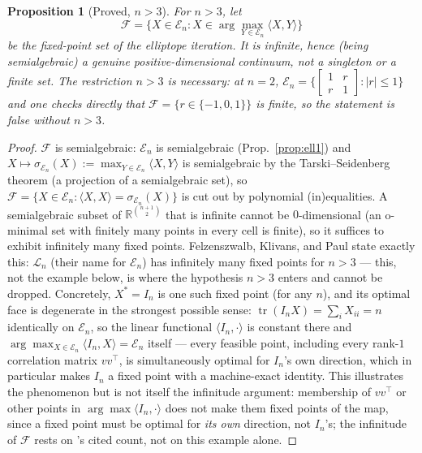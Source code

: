 \documentclass[11pt]{article}
\theoremstyle{plain}
\newtheorem{proposition}[theorem]{Proposition}
\theoremstyle{definition}
\theoremstyle{remark}
\newcommand{\R}{\mathbb R}
\newcommand{\El}{\mathcal E_n}
\begin{document}
\begin{proposition}[Proved, $n>3$]\label{prop:ell3}
For $n>3$, let
\[
\mathcal F=\{X\in\El:X\in\arg\max_{Y\in\El}\langle X,Y\rangle\}
\]
be the fixed-point set of the elliptope iteration. It is infinite, hence (being
semialgebraic) a genuine positive-dimensional continuum, not a singleton
or a finite set. The restriction $n>3$ is necessary: at
$n=2$, $\El=\{[\begin{smallmatrix}1&r\\r&1\end{smallmatrix}]:|r|\le1\}$ and
one checks directly that $\mathcal F=\{r\in\{-1,0,1\}\}$ is finite, so the
statement is false without $n>3$.
\end{proposition}
\begin{proof}
$\mathcal F$ is semialgebraic: $\El$ is semialgebraic
(Prop.~\ref{prop:ell1}) and $X\mapsto\sigma_{\El}(X):=\max_{Y\in\El}\langle
X,Y\rangle$ is semialgebraic by the Tarski--Seidenberg theorem (a
projection of a semialgebraic set), so $\mathcal F=\{X\in\El:\langle
X,X\rangle=\sigma_{\El}(X)\}$ is cut out by polynomial (in)equalities. A
semialgebraic subset of $\R^{\binom{n+1}2}$ that is infinite cannot be
$0$-dimensional (an o-minimal set with finitely many points in every cell
is finite), so it suffices to exhibit infinitely many fixed points.
Felzenszwalb, Klivans, and Paul \cite{FKP21} state exactly this: $\mathcal
L_n$ (their name for $\El$) has infinitely many fixed points for $n>3$ ---
this, not the example below, is where the hypothesis $n>3$ enters and
cannot be dropped. Concretely, $X^*=I_n$ is one such fixed point (for any
$n$), and its optimal face is
degenerate in the strongest possible sense: $\operatorname{tr}(I_nX)=\sum_iX_{ii}=n$
identically on $\El$, so the linear functional $\langle I_n,\cdot\rangle$
is constant there and $\arg\max_{X\in\El}\langle I_n,X\rangle=\El$ itself
--- every feasible point, including every rank-$1$ correlation matrix
$vv^\top$, is simultaneously optimal for $I_n$'s own direction, which in
particular makes $I_n$ a fixed point with a machine-exact identity. This
illustrates the phenomenon but is not itself the infinitude argument:
membership of $vv^\top$ or other points in $\arg\max\langle I_n,\cdot\rangle$
does not make them fixed points of the map, since a fixed point must be
optimal for \emph{its own} direction, not $I_n$'s; the infinitude of
$\mathcal F$ rests on \cite{FKP21}'s cited count, not on this example
alone.
\end{proof}
\end{document}
